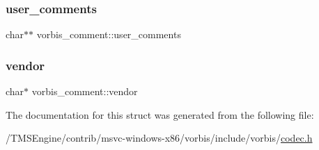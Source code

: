 \mbox{\label{structvorbis__comment_ac45cb70542b0be5ce3e8d85db6df48ec}} 
\subsubsection{\texorpdfstring{user\+\_\+comments}{user\_comments}}
{\footnotesize\ttfamily char$\ast$$\ast$ vorbis\+\_\+comment\+::user\+\_\+comments}

\mbox{\label{structvorbis__comment_a1f25158a2c045a6dd8a13b33b34612d3}} 
\subsubsection{\texorpdfstring{vendor}{vendor}}
{\footnotesize\ttfamily char$\ast$ vorbis\+\_\+comment\+::vendor}



The documentation for this struct was generated from the following file\+:\begin{DoxyCompactItemize}
\item 
/\+T\+M\+S\+Engine/contrib/msvc-\/windows-\/x86/vorbis/include/vorbis/\hyperlink{codec_8h}{codec.\+h}\end{DoxyCompactItemize}
